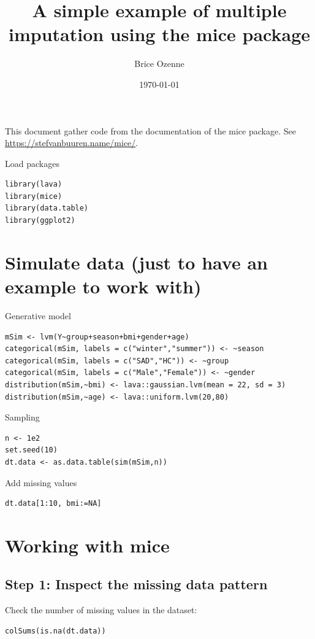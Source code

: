 \documentclass[12pt]{article}
\author{Brice Ozenne}
\date{\today}
\title{A simple example of multiple imputation using the mice package}
\begin{document}
\maketitle
This document gather code from the documentation of the mice
package. See \url{https://stefvanbuuren.name/mice/}.

\bigskip

Load packages
\lstset{language=r,label= ,caption= ,captionpos=b,numbers=none}
\begin{lstlisting}
library(lava)
library(mice)
library(data.table)
library(ggplot2)
\end{lstlisting}

\section{Simulate data (just to have an example to work with)}
\label{sec:org9e85ddf}
Generative model
\lstset{language=r,label= ,caption= ,captionpos=b,numbers=none}
\begin{lstlisting}
mSim <- lvm(Y~group+season+bmi+gender+age)
categorical(mSim, labels = c("winter","summer")) <- ~season
categorical(mSim, labels = c("SAD","HC")) <- ~group
categorical(mSim, labels = c("Male","Female")) <- ~gender
distribution(mSim,~bmi) <- lava::gaussian.lvm(mean = 22, sd = 3)
distribution(mSim,~age) <- lava::uniform.lvm(20,80)
\end{lstlisting}

Sampling
\lstset{language=r,label= ,caption= ,captionpos=b,numbers=none}
\begin{lstlisting}
n <- 1e2
set.seed(10)
dt.data <- as.data.table(sim(mSim,n))
\end{lstlisting}

Add missing values
\lstset{language=r,label= ,caption= ,captionpos=b,numbers=none}
\begin{lstlisting}
dt.data[1:10, bmi:=NA]
\end{lstlisting}

\clearpage

\section{Working with mice}
\label{sec:org37e734f}

\subsection{Step 1: Inspect the missing data pattern}
\label{sec:org59c8972}
Check the number of missing values in the dataset:
\lstset{language=r,label= ,caption= ,captionpos=b,numbers=none}
\begin{lstlisting}
colSums(is.na(dt.data))
\end{lstlisting}
\end{document}
